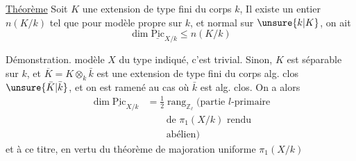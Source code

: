 \uline{Théorème} Soit $K$ une extension de type fini du
corps $k$,   Il
 existe un entier $n(K/k)$
tel que pour  modèle  propre sur $k$, et
normal sur $\unsure{k|K}$,  on ait 
\[
\dim\underline{\mathrm{Pic}}_{X/k}\leq n(K/k)
\]

Démonstration.  
modèle $X$ du type indiqué, c'est trivial.
Sinon, $K$ est séparable sur $k$, et
$\overline K=K\otimes_k\bar k$ est une extension de type
fini du corps alg. clos $\unsure{\bar K|\bar k}$, et on
est ramené au cas où $\bar k$ est alg. clos.
On a alors
\[
\begin{aligned}
\dim\underline{\mathrm{Pic}}_{X/k}
&=\tfrac12\operatorname{rang}_{\mathbb Z_{\ell}}
  \bigl(\text{partie $l$-primaire}\\
&\qquad \text{de $\pi_1(X/k)$ rendu}\\
&\qquad \text{abélien}\bigr)
\end{aligned}
\]
et à ce titre, en vertu du théorème
de majoration uniforme  $\pi_1(X/k)$
